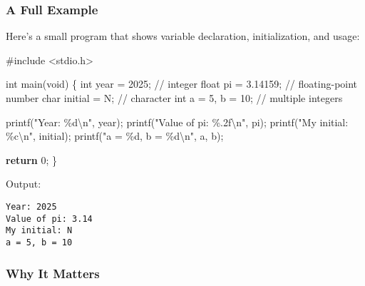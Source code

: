 \documentclass[
  letterpaper,
  DIV=11,
  numbers=noendperiod]{scrreprt}
\newenvironment{Shaded}{\begin{snugshade}}{\end{snugshade}}
\newcommand{\CharTok}[1]{\textcolor[rgb]{0.13,0.47,0.30}{#1}}
\newcommand{\CommentTok}[1]{\textcolor[rgb]{0.37,0.37,0.37}{#1}}
\newcommand{\ControlFlowTok}[1]{\textcolor[rgb]{0.00,0.23,0.31}{\textbf{#1}}}
\newcommand{\DataTypeTok}[1]{\textcolor[rgb]{0.68,0.00,0.00}{#1}}
\newcommand{\DecValTok}[1]{\textcolor[rgb]{0.68,0.00,0.00}{#1}}
\newcommand{\FloatTok}[1]{\textcolor[rgb]{0.68,0.00,0.00}{#1}}
\newcommand{\ImportTok}[1]{\textcolor[rgb]{0.00,0.46,0.62}{#1}}
\newcommand{\NormalTok}[1]{\textcolor[rgb]{0.00,0.23,0.31}{#1}}
\newcommand{\OperatorTok}[1]{\textcolor[rgb]{0.37,0.37,0.37}{#1}}
\newcommand{\PreprocessorTok}[1]{\textcolor[rgb]{0.68,0.00,0.00}{#1}}
\newcommand{\SpecialCharTok}[1]{\textcolor[rgb]{0.37,0.37,0.37}{#1}}
\newcommand{\StringTok}[1]{\textcolor[rgb]{0.13,0.47,0.30}{#1}}
\begin{document}
\subsubsection{A Full Example}\label{a-full-example}

Here's a small program that shows variable declaration, initialization,
and usage:

\begin{Shaded}
\begin{Highlighting}[]
\PreprocessorTok{\#include }\ImportTok{\textless{}stdio.h\textgreater{}}

\DataTypeTok{int}\NormalTok{ main}\OperatorTok{(}\DataTypeTok{void}\OperatorTok{)} \OperatorTok{\{}
    \DataTypeTok{int}\NormalTok{ year }\OperatorTok{=} \DecValTok{2025}\OperatorTok{;}          \CommentTok{// integer}
    \DataTypeTok{float}\NormalTok{ pi }\OperatorTok{=} \FloatTok{3.14159}\OperatorTok{;}       \CommentTok{// floating{-}point number}
    \DataTypeTok{char}\NormalTok{ initial }\OperatorTok{=} \CharTok{\textquotesingle{}N\textquotesingle{}}\OperatorTok{;}       \CommentTok{// character}
    \DataTypeTok{int}\NormalTok{ a }\OperatorTok{=} \DecValTok{5}\OperatorTok{,}\NormalTok{ b }\OperatorTok{=} \DecValTok{10}\OperatorTok{;}        \CommentTok{// multiple integers}

\NormalTok{    printf}\OperatorTok{(}\StringTok{"Year: }\SpecialCharTok{\%d\textbackslash{}n}\StringTok{"}\OperatorTok{,}\NormalTok{ year}\OperatorTok{);}
\NormalTok{    printf}\OperatorTok{(}\StringTok{"Value of pi: }\SpecialCharTok{\%.2f\textbackslash{}n}\StringTok{"}\OperatorTok{,}\NormalTok{ pi}\OperatorTok{);}
\NormalTok{    printf}\OperatorTok{(}\StringTok{"My initial: }\SpecialCharTok{\%c\textbackslash{}n}\StringTok{"}\OperatorTok{,}\NormalTok{ initial}\OperatorTok{);}
\NormalTok{    printf}\OperatorTok{(}\StringTok{"a = }\SpecialCharTok{\%d}\StringTok{, b = }\SpecialCharTok{\%d\textbackslash{}n}\StringTok{"}\OperatorTok{,}\NormalTok{ a}\OperatorTok{,}\NormalTok{ b}\OperatorTok{);}

    \ControlFlowTok{return} \DecValTok{0}\OperatorTok{;}
\OperatorTok{\}}
\end{Highlighting}
\end{Shaded}

Output:

\begin{verbatim}
Year: 2025
Value of pi: 3.14
My initial: N
a = 5, b = 10
\end{verbatim}

\subsubsection{Why It Matters}\label{why-it-matters-6}
\end{document}
